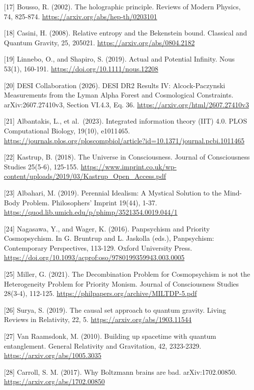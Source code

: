 \documentclass[
  10pt,
  a4paper,
]{article}
\begin{document}
{[}17{]} Bousso, R. (2002). The holographic principle. Reviews of Modern
Physics, 74, 825-874. \url{https://arxiv.org/abs/hep-th/0203101}

{[}18{]} Casini, H. (2008). Relative entropy and the Bekenstein bound.
Classical and Quantum Gravity, 25, 205021.
\url{https://arxiv.org/abs/0804.2182}

{[}19{]} Linnebo, O., and Shapiro, S. (2019). Actual and Potential
Infinity. Nous 53(1), 160-191. \url{https://doi.org/10.1111/nous.12208}

{[}20{]} DESI Collaboration (2026). DESI DR2 Results IV:
Alcock-Paczynski Measurements from the Lyman Alpha Forest and
Cosmological Constraints. arXiv:2607.27410v3, Section VI.4.3, Eq. 36.
\url{https://arxiv.org/html/2607.27410v3}

{[}21{]} Albantakis, L., et al.~(2023). Integrated information theory
(IIT) 4.0. PLOS Computational Biology, 19(10), e1011465.
\url{https://journals.plos.org/ploscompbiol/article?id=10.1371/journal.pcbi.1011465}

{[}22{]} Kastrup, B. (2018). The Universe in Consciousness. Journal of
Consciousness Studies 25(5-6), 125-155.
\url{https://www.imprint.co.uk/wp-content/uploads/2019/03/Kastrup_Open_Access.pdf}

{[}23{]} Albahari, M. (2019). Perennial Idealism: A Mystical Solution to
the Mind-Body Problem. Philosophers' Imprint 19(44), 1-37.
\url{https://quod.lib.umich.edu/p/phimp/3521354.0019.044/1}

{[}24{]} Nagasawa, Y., and Wager, K. (2016). Panpsychism and Priority
Cosmopsychism. In G. Bruntrup and L. Jaskolla (eds.), Panpsychism:
Contemporary Perspectives, 113-129. Oxford University Press.
\url{https://doi.org/10.1093/acprof:oso/9780199359943.003.0005}

{[}25{]} Miller, G. (2021). The Decombination Problem for Cosmopsychism
is not the Heterogeneity Problem for Priority Monism. Journal of
Consciousness Studies 28(3-4), 112-125.
\url{https://philpapers.org/archive/MILTDP-5.pdf}

{[}26{]} Surya, S. (2019). The causal set approach to quantum gravity.
Living Reviews in Relativity, 22, 5.
\url{https://arxiv.org/abs/1903.11544}

{[}27{]} Van Raamsdonk, M. (2010). Building up spacetime with quantum
entanglement. General Relativity and Gravitation, 42, 2323-2329.
\url{https://arxiv.org/abs/1005.3035}

{[}28{]} Carroll, S. M. (2017). Why Boltzmann brains are bad.
arXiv:1702.00850. \url{https://arxiv.org/abs/1702.00850}
\end{document}
